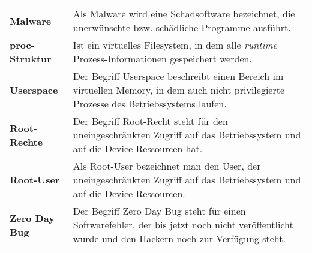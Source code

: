 \begin{table*}[htbp]
\begin{center}
\begin{tabular}{p{3cm}p{12cm}}
		  \textbf{Malware} &  Als Malware wird eine Schadsoftware bezeichnet, die unerwünschte bzw. schädliche Programme ausführt.\\
		 
		  \textbf{proc-Struktur} & Ist ein virtuelles Filesystem, in dem alle \textit{\glqq runtime\grqq{}} Prozess-Informationen gespeichert werden.\\
		  
		  \textbf{Userspace} & Der Begriff Userspace beschreibt einen Bereich im virtuellen Memory, in dem auch nicht privilegierte Prozesse des Betriebssystems laufen.\\
		  
		 \textbf{Root-Rechte} &  Der Begriff Root-Recht steht für den uneingeschränkten Zugriff auf das Betriebssystem und auf die Device Ressourcen hat.\\
		 \textbf{Root-User} &  Als Root-User bezeichnet man den User, der uneingeschränkten Zugriff auf das Betriebssystem und auf die Device Ressourcen.\\ 
		 \textbf{Zero Day Bug} &  Der Begriff Zero Day Bug steht für einen Softwarefehler, der bis jetzt noch nicht veröffentlicht wurde und den Hackern noch zur Verfügung steht.\\
		  
		\end{tabular}		    
    \end{center}
\end{table*}